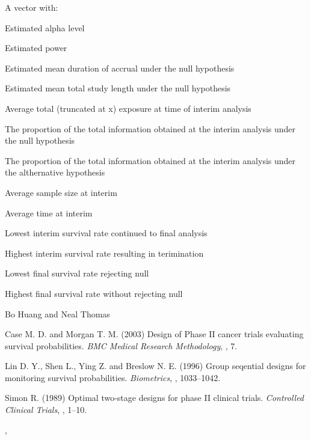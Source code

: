 \begin{Value}
A vector with:

\begin{ldescription}
\item[\code{alpha}] Estimated alpha level
\item[\code{power}] Estimated power
\item[\code{eda}] Estimated mean duration of accrual under the null hypothesis
\item[\code{etsl}] Estimated mean total study length under the null hypothesis
\item[\code{aveE}] Average total (truncated at x) exposure at time of interim
analysis
\item[\code{pinfoNull}] The proportion of the total information obtained at
the interim analysis under the null hypothesis
\item[\code{pinfoAlt}] The proportion of the total information obtained at
the interim analysis under the althernative hypothesis
\item[\code{n1}] Average sample size at interim
\item[\code{t1}] Average time at interim
\item[\code{phatKl}] Lowest interim survival rate continued to final analysis
\item[\code{phatKh}] Highest interim survival rate resulting in terimination
\item[\code{phatRl}] Lowest final survival rate rejecting null
\item[\code{phatRh}] Highest final survival rate without rejecting null
\end{ldescription}
\end{Value}
\begin{Author}\relax
Bo Huang  and Neal Thomas
\end{Author}
\begin{References}\relax
Case M. D. and Morgan T. M. (2003) Design of Phase II cancer trials
evaluating survival probabilities. \emph{BMC Medical Research
Methodology}, , 7.

Lin D. Y., Shen L., Ying Z. and Breslow N. E. (1996) Group seqential
designs for monitoring survival probabilities. \emph{Biometrics},
, 1033--1042.

Simon R. (1989) Optimal two-stage designs for phase II clinical
trials. \emph{Controlled Clinical Trials}, , 1--10.
\end{References}
\begin{SeeAlso}\relax
{}, 
\end{SeeAlso}
